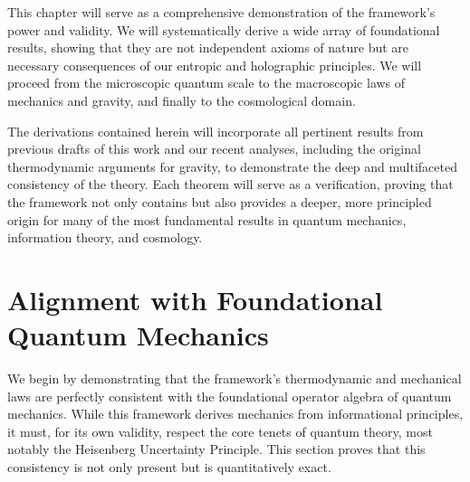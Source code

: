 \documentclass[11pt, letterpaper]{report}
\theoremstyle{plain} %
\theoremstyle{definition} %
\theoremstyle{remark} %
\begin{document}
This chapter will serve as a comprehensive demonstration of the framework's power and validity. We will systematically derive a wide array of foundational results, showing that they are not independent axioms of nature but are necessary consequences of our entropic and holographic principles. We will proceed from the microscopic quantum scale to the macroscopic laws of mechanics and gravity, and finally to the cosmological domain.

The derivations contained herein will incorporate all pertinent results from previous drafts of this work and our recent analyses, including the original thermodynamic arguments for gravity, to demonstrate the deep and multifaceted consistency of the theory. Each theorem will serve as a verification, proving that the framework not only contains but also provides a deeper, more principled origin for many of the most fundamental results in quantum mechanics, information theory, and cosmology.

\section{Alignment with Foundational Quantum Mechanics}
\label{sec:verify_qm}

We begin by demonstrating that the framework’s thermodynamic and mechanical laws are perfectly consistent with the foundational operator algebra of quantum mechanics. While this framework derives mechanics from informational principles, it must, for its own validity, respect the core tenets of quantum theory, most notably the Heisenberg Uncertainty Principle. This section proves that this consistency is not only present but is quantitatively exact.
\end{document}
